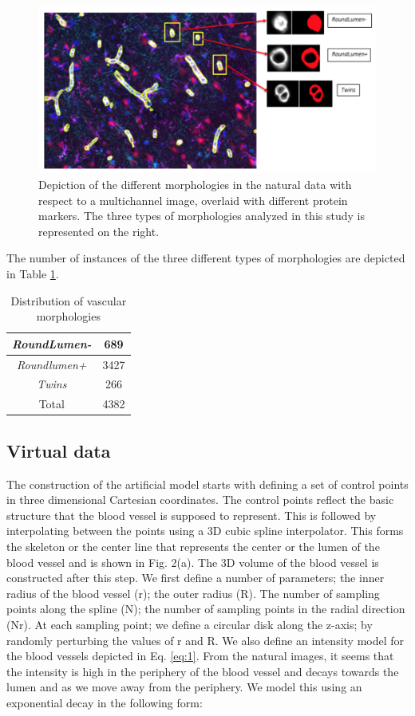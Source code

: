 \begin{figure}[ht!]
\centering
\includegraphics[width=1.0\textwidth]{img/morphologies}
\caption{Depiction of the different morphologies in the natural data with respect to a multichannel image, overlaid with different protein markers. The three types of morphologies analyzed in this study is represented on the right.}
\label{fig:morphologies}
\end{figure}

The number of instances of the three different types of morphologies are depicted in Table \ref{table:classes}.
\begin{table}[ht!]
\caption{Distribution of vascular morphologies}
\centering
\begin{tabular}{ | c | c |} 
\hline
\textit{RoundLumen-} & 689 \\ 
\hline
\textit{Roundlumen+} & 3427 \\ 
\hline
\textit{Twins} & 266 \\ 
\hline
Total & 4382 \\ 
\hline
\end{tabular}
\label{table:classes}
\end{table}

\subsection{Virtual data}
The construction of the artificial model starts with defining a set of control points in three dimensional Cartesian coordinates. The control points reflect the basic structure that the blood vessel is supposed to represent. This is followed by interpolating between the points using a 3D cubic spline interpolator. This forms the skeleton or the center line that represents the center or the lumen of the blood vessel and is shown in Fig. 2(a). The 3D volume of the blood vessel is constructed after this step. We first define a number of parameters; the inner radius of the blood vessel (r); the outer radius (R). The number of sampling points along the spline (N); the number of sampling points in the radial direction (Nr). At each sampling point; we define a circular disk along the z-axis; by randomly perturbing the values of r and R. We also define an intensity model for the blood vessels depicted in Eq. \ref{eq:1}. From the natural images, it seems that the intensity is high in the periphery of the blood vessel and decays towards the lumen and as we move away from the periphery. We model this using an exponential decay in the following form:

